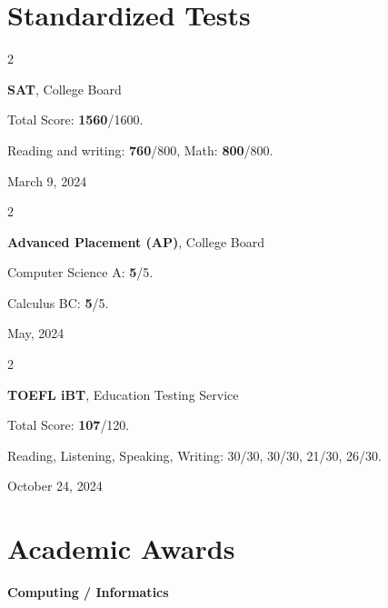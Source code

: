 \documentclass[10pt, letterpaper]{article}
\newenvironment{twocolentry}[2][]{
    \onecolentry
    \def\secondColumn{#2}
    \setcolumnwidth{\fill, 4.5 cm}
    \begin{paracol}{2}
}{
    \switchcolumn \raggedleft \secondColumn
    \end{paracol}
    \endonecolentry
} %
\begin{document}
    \section{Standardized Tests}
    \begin{twocolentry}{March 9, 2024}
        \setlength{\parindent}{20pt}

        \noindent\textbf{SAT}, College Board

        \vspace{5pt}

        Total Score: \textbf{1560}/1600. 

        Reading and writing: \textbf{760}/800, Math: \textbf{800}/800.
        
    \end{twocolentry}

    \vspace{0.2cm}

    \begin{twocolentry}{May, 2024}
        \setlength{\parindent}{20pt}

        \textbf{Advanced Placement (AP)}, College Board

        \vspace{5pt}

        Computer Science A: \textbf{5}/5.

        Calculus BC: \textbf{5}/5.
        
    \end{twocolentry}
    
    \vspace{0.2cm}

    \begin{twocolentry}{October 24, 2024}
        \setlength{\parindent}{20pt}

        \textbf{TOEFL iBT}, Education Testing Service

        \vspace{5pt}

        Total Score: \textbf{107}/120.

        Reading, Listening, Speaking, Writing: 30/30, 30/30, 21/30, 26/30.
        
    \end{twocolentry}

    \section{Academic Awards}

    
    \textbf{Computing / Informatics}
\end{document}
